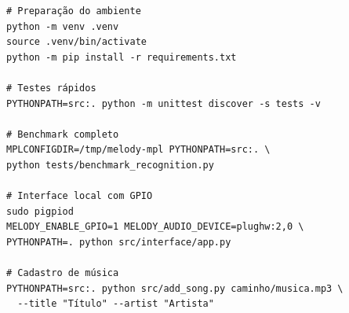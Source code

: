 \documentclass[12pt,a4paper]{article}
\begin{document}
\begin{verbatim}
# Preparação do ambiente
python -m venv .venv
source .venv/bin/activate
python -m pip install -r requirements.txt

# Testes rápidos
PYTHONPATH=src:. python -m unittest discover -s tests -v

# Benchmark completo
MPLCONFIGDIR=/tmp/melody-mpl PYTHONPATH=src:. \
python tests/benchmark_recognition.py

# Interface local com GPIO
sudo pigpiod
MELODY_ENABLE_GPIO=1 MELODY_AUDIO_DEVICE=plughw:2,0 \
PYTHONPATH=. python src/interface/app.py

# Cadastro de música
PYTHONPATH=src:. python src/add_song.py caminho/musica.mp3 \
  --title "Título" --artist "Artista"
\end{verbatim}
\end{document}
